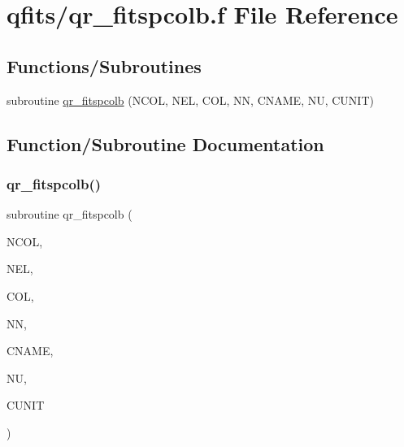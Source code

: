 \hypertarget{qr__fitspcolb_8f}{}\section{qfits/qr\+\_\+fitspcolb.f File Reference}
\label{qr__fitspcolb_8f}
\subsection*{Functions/\+Subroutines}
\begin{DoxyCompactItemize}
\item 
subroutine \hyperlink{qr__fitspcolb_8f_a279959feae52d67fd55c8e6205e66a45}{qr\+\_\+fitspcolb} (N\+C\+OL, N\+EL, C\+OL, NN, C\+N\+A\+ME, NU, C\+U\+N\+IT)
\end{DoxyCompactItemize}


\subsection{Function/\+Subroutine Documentation}
\mbox{\label{qr__fitspcolb_8f_a279959feae52d67fd55c8e6205e66a45}} 
\subsubsection{\texorpdfstring{qr\+\_\+fitspcolb()}{qr\_fitspcolb()}}
{\footnotesize\ttfamily subroutine qr\+\_\+fitspcolb (\begin{DoxyParamCaption}\item[{integer}]{N\+C\+OL,  }\item[{integer}]{N\+EL,  }\item[{integer, dimension(nel)}]{C\+OL,  }\item[{integer}]{NN,  }\item[{character$\ast$(nn)}]{C\+N\+A\+ME,  }\item[{integer}]{NU,  }\item[{character$\ast$(nu)}]{C\+U\+N\+IT }\end{DoxyParamCaption})}

